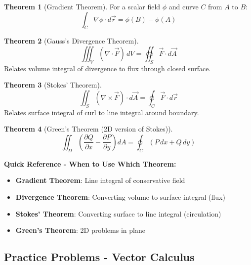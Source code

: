 \documentclass[12pt,a4paper]{article}
\theoremstyle{definition}
\newtheorem{theorem}{Theorem}[section]
\begin{document}
\begin{theorem}[Gradient Theorem]
For a scalar field $\phi$ and curve $C$ from $A$ to $B$:
\[
\int_C \nabla\phi \cdot d\vec{r} = \phi(B) - \phi(A)
\]
\end{theorem}

\begin{theorem}[Gauss's Divergence Theorem]
\[
\iiint_V (\nabla \cdot \vec{F})\,dV = \oiint_S \vec{F} \cdot d\vec{A}
\]
Relates volume integral of divergence to flux through closed surface.
\end{theorem}

\begin{theorem}[Stokes' Theorem]
\[
\iint_S (\nabla \times \vec{F}) \cdot d\vec{A} = \oint_C \vec{F} \cdot d\vec{r}
\]
Relates surface integral of curl to line integral around boundary.
\end{theorem}

\begin{theorem}[Green's Theorem (2D version of Stokes)]
\[
\iint_D \left(\frac{\partial Q}{\partial x} - \frac{\partial P}{\partial y}\right)dA = \oint_C (P\,dx + Q\,dy)
\]
\end{theorem}

\begin{importantbox}
\textbf{Quick Reference - When to Use Which Theorem:}
\begin{itemize}
    \item \textbf{Gradient Theorem}: Line integral of conservative field
    \item \textbf{Divergence Theorem}: Converting volume to surface integral (flux)
    \item \textbf{Stokes' Theorem}: Converting surface to line integral (circulation)
    \item \textbf{Green's Theorem}: 2D problems in plane
\end{itemize}
\end{importantbox}

\subsection{Practice Problems - Vector Calculus}
\end{document}
